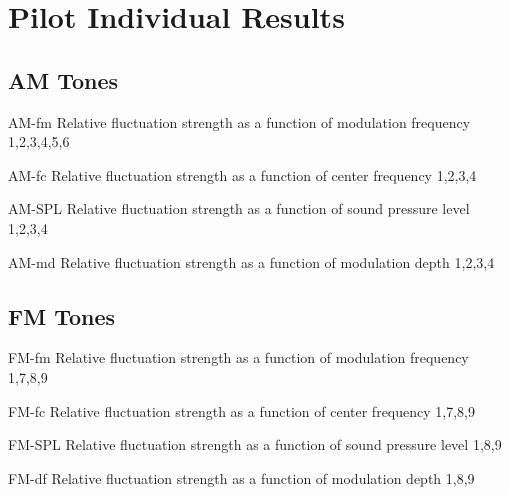 \documentclass[../main.tex]{subfiles}
\begin{document}
\chapter{Pilot Individual Results}
\label{cha:pilot_individual_results}

\begin{pilotresults}

\section{AM Tones}

  {AM-fm}
  {Relative fluctuation strength as a function of modulation frequency}
  {1,2,3,4,5,6}

  {AM-fc}
  {Relative fluctuation strength as a function of center frequency}
  {1,2,3,4}

  {AM-SPL}
  {Relative fluctuation strength as a function of sound pressure level}
  {1,2,3,4}

  {AM-md}
  {Relative fluctuation strength as a function of modulation depth}
  {1,2,3,4}

\section{FM Tones}

  {FM-fm}
  {Relative fluctuation strength as a function of modulation frequency}
  {1,7,8,9}

  {FM-fc}
  {Relative fluctuation strength as a function of center frequency}
  {1,7,8,9}

  {FM-SPL}
  {Relative fluctuation strength as a function of sound pressure level}
  {1,8,9}

  {FM-df}
  {Relative fluctuation strength as a function of modulation depth}
  {1,8,9}

\end{pilotresults}
\end{document}

